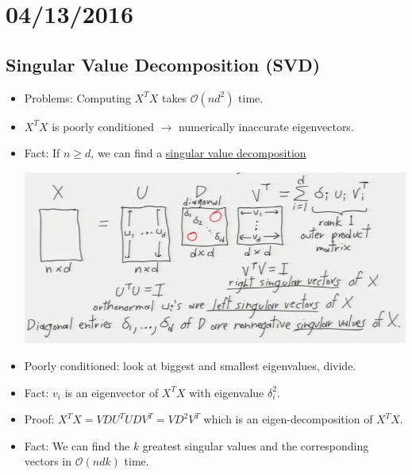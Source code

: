 \documentclass[10pt]{article}
\newcommand{\bigo}{\mathcal{O}}
\begin{document}
\section*{04/13/2016}
\subsection*{Singular Value Decomposition (SVD)}
\begin{itemize}
	\item Problems: Computing $X^{T}X$ takes $\bigo(nd^{2})$ time.
	\item $X^{T}X$ is poorly conditioned $\rightarrow$ numerically inaccurate eigenvectors.
	\item Fact: If $n \geq d$, we can find a \underline{singular value decomposition}
	\begin{center}
		\includegraphics[scale=0.6]{../images/svd}
	\end{center}
	\item Poorly conditioned: look at biggest and smallest eigenvalues, divide.
	\item Fact: $v_{i}$ is an eigenvector of $X^{T}X$ with eigenvalue $\delta_{i}^{2}$.
	\item Proof: $X^{T}X = VDU^{T}UDV^{T} = VD^{2}V^{T}$ which is an eigen-decomposition of $X^{T}X$.
	\item Fact: We can find the $k$ greatest singular values and the corresponding vectors in $\bigo(ndk)$ time.
\end{itemize}
\end{document}
